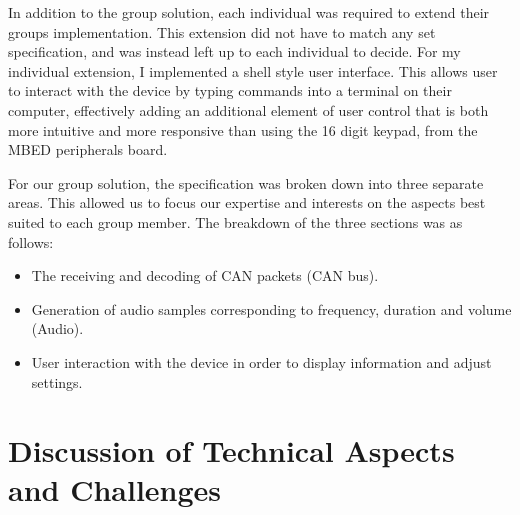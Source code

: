 \noindent
In addition to the group solution, each individual was required to extend their 
groups implementation.  
This extension did not have to match any set specification, and was instead left 
up to each individual to decide.
For my individual extension, I implemented a shell style user interface. 
This allows user to interact with the device by typing commands into a terminal 
on their computer, effectively adding an additional element of user control that 
is both more intuitive and more responsive than using the 16 digit keypad, from 
the MBED peripherals board.
\par\bigskip\noindent
For our group solution, the specification was broken down into three separate 
areas. 
This allowed us to focus our expertise and interests on the aspects best 
suited to each group member.
The breakdown of the three sections was as follows: 
\begin{itemize}
    \item 
        The receiving and decoding of CAN packets (CAN bus).
    \item 
        Generation of audio samples corresponding to frequency, duration and 
        volume (Audio).
    \item 
        User interaction with the device in order to display information 
        and adjust settings.
\end{itemize}



\section{Discussion of Technical Aspects and Challenges}

